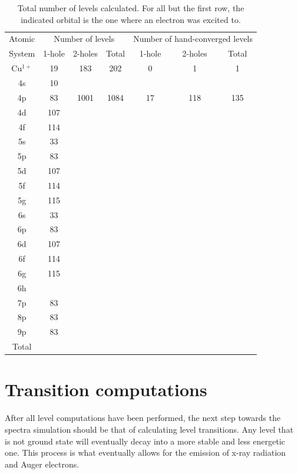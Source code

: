 \begin{table}[h!]
    \centering
    \caption{Total number of levels calculated. For all but the first row, the indicated orbital is the one where an electron was excited to.}
    \label{tab:tot_levels}
    \begin{tabular}{c||c|c|c||c|c|c}
        \toprule Atomic&\multicolumn{3}{c||}{Number of levels}&\multicolumn{3}{c}{Number of hand-converged levels}\\
        System&1-hole&2-holes&Total&1-hole&2-holes&Total\\
        \midrule
        Cu$^{1+}$ & 19 &183&202&0&1&1\\ 
        4s& 10\\
        4p & 83 &1001 &1084&17&118&135\\
        4d & 107 &\\
        4f & 114\\
        5s & 33\\
        5p & 83\\
        5d & 107\\
        5f & 114\\
        5g & 115\\
        6s & 33\\
        6p & 83\\
        6d & 107\\
        6f & 114\\
        6g & 115\\
        6h\\
        7p & 83\\
        8p & 83\\
        9p & 83\\
        \midrule
        Total\\
        \bottomrule
    \end{tabular}
\end{table}



\section{Transition computations}

After all level computations have been performed, the next step towards the spectra simulation should be that of calculating level transitions. Any level that is not ground state will eventually decay into a more stable and less energetic one. This process is what eventually allows for the emission of x-ray radiation and Auger electrons.

